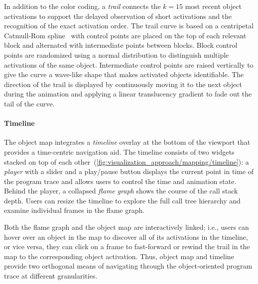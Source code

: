 In addition to the color coding, a \emph{trail} connects the $k = 15$ most recent object activations to support the delayed observation of short activations and the recognition of the exact activation order.
The trail curve is based on a centripetal Catmull-Rom spline~\cite{catmull1974class} with control points are placed on the top of each relevant block and alternated with intermediate points between blocks.
Block control points are randomized using a normal distribution to distinguish multiple activations of the same object.
Intermediate control points are raised vertically to give the curve a wave-like shape that makes activated objects identifiable.
The direction of the trail is displayed by continuously moving it to the next object during the animation and applying a linear translucency gradient to fade out the tail of the curve.

\paragraph{Timeline}
\label{sec:visualization_approach/mapping/timeline}

The object map integrates a \emph{timeline} overlay at the bottom of the viewport that provides a time-centric navigation aid.
The timeline consists of two widgets stacked on top of each other~(\cref{fig:visualization_approach/mapping/timeline}):
a \emph{player} with a slider and a play/pause button displays the current point in time of the program trace and allows users to control the time and animation state.
Behind the player, a collapsed \emph{flame graph} shows the course of the call stack depth.
Users can resize the timeline to explore the full call tree hierarchy and examine individual frames in the flame graph.

Both the flame graph and the object map are interactively linked; i.e., users can hover over an object in the map to discover all of its activations in the timeline, or vice versa, they can click on a frame to fast-forward or rewind the trail in the map to the corresponding object activation.
Thus, object map and timeline provide two orthogonal means of navigating through the object-oriented program trace at different granularities.

